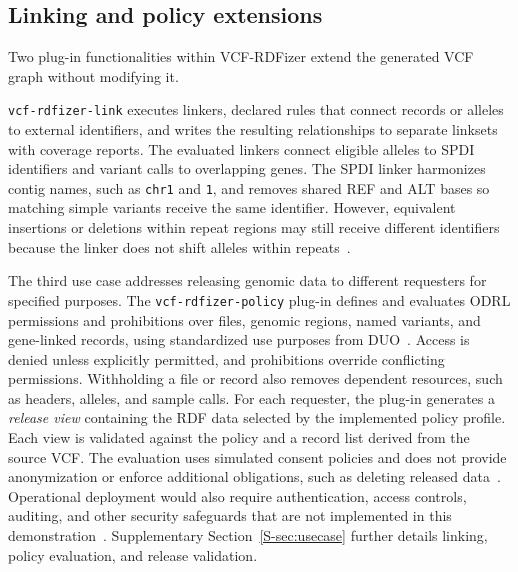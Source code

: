 \documentclass[pdflatex,sn-mathphys-num,referee]{sn-jnl}
\begin{document}
\subsection{Linking and policy extensions}\label{subsec:extensions}
Two plug-in functionalities within VCF-RDFizer extend the generated VCF graph without modifying it.

\texttt{vcf-rdfizer-link} executes linkers, declared rules that connect records or alleles to external identifiers, and writes the resulting relationships to separate linksets with coverage reports.
The evaluated linkers connect eligible alleles to SPDI identifiers and variant calls to overlapping genes.
The SPDI linker harmonizes contig names, such as \texttt{chr1} and \texttt{1}, and removes shared REF and ALT bases so matching simple variants receive the same identifier.
However, equivalent insertions or deletions within repeat regions may still receive different identifiers because the linker does not shift alleles within repeats~\cite{holmes2020spdi}.

The third use case addresses releasing genomic data to different requesters for specified purposes.
The \texttt{vcf-rdfizer-policy} plug-in defines and evaluates ODRL permissions and prohibitions over files, genomic regions, named variants, and gene-linked records, using standardized use purposes from DUO~\cite{odrl_2018,lawson2021duo}.
Access is denied unless explicitly permitted, and prohibitions override conflicting permissions.
Withholding a file or record also removes dependent resources, such as headers, alleles, and sample calls.
For each requester, the plug-in generates a \emph{release view} containing the RDF data selected by the implemented policy profile.
Each view is validated against the policy and a record list derived from the source VCF.
The evaluation uses simulated consent policies and does not provide anonymization or enforce additional obligations, such as deleting released data~\cite{garfinkel2023deidentification}.
Operational deployment would also require authentication, access controls, auditing, and other security safeguards that are not implemented in this demonstration~\cite{ga4gh2019dsip}.
Supplementary Section~\ref{S-sec:usecase} further details linking, policy evaluation, and release validation.
\end{document}
